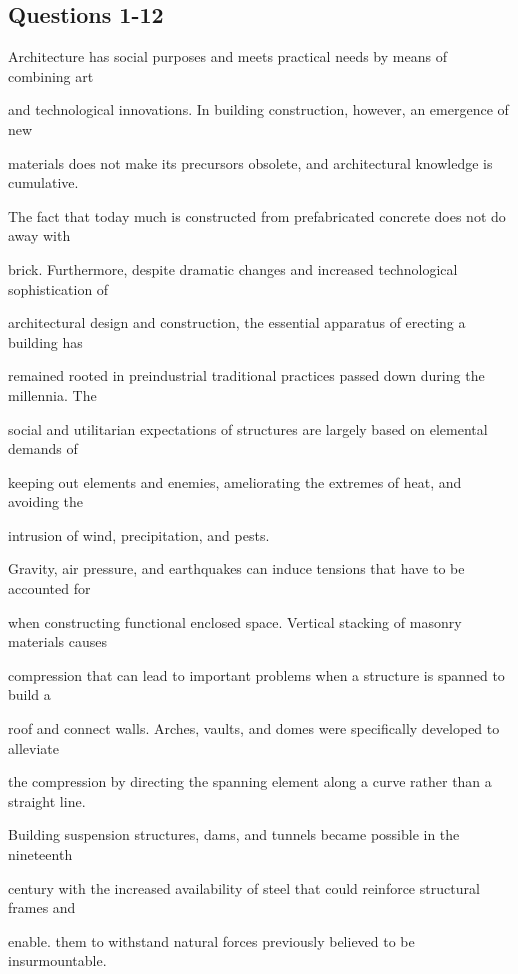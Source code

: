 \documentclass[12pt]{article}
\begin{document}
\subsection*{Questions 1-12}
\begingroup
\small
\sloppy
\setlength{\parskip}{0pt}
\setlength{\parindent}{0pt}
Architecture has social purposes and meets practical needs by means of combining art\par
and technological innovations. In building construction, however, an emergence of new\par
materials does not make its precursors obsolete, and architectural knowledge is cumulative.\par
The fact that today much is constructed from prefabricated concrete does not do away with\par
brick. Furthermore, despite dramatic changes and increased technological sophistication of\par
architectural design and construction, the essential apparatus of erecting a building has\par
remained rooted in preindustrial traditional practices passed down during the millennia. The\par
social and utilitarian expectations of structures are largely based on elemental demands of\par
keeping out elements and enemies, ameliorating the extremes of heat, and avoiding the\par
intrusion of wind, precipitation, and pests.\par
Gravity, air pressure, and earthquakes can induce tensions that have to be accounted for\par
when constructing functional enclosed space. Vertical stacking of masonry materials causes\par
compression that can lead to important problems when a structure is spanned to build a\par
roof and connect walls. Arches, vaults, and domes were specifically developed to alleviate\par
the compression by directing the spanning element along a curve rather than a straight line.\par
Building suspension structures, dams, and tunnels became possible in the nineteenth\par
century with the increased availability of steel that could reinforce structural frames and\par
enable. them to withstand natural forces previously believed to be insurmountable.\par
\end{document}
